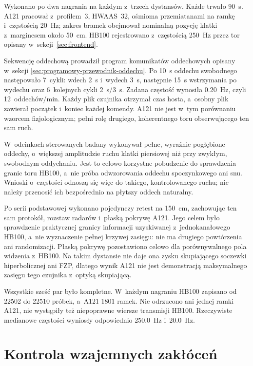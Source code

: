 \documentclass[12pt,a4paper,oneside]{report}
\begin{document}
Wykonano po dwa nagrania na każdym z~trzech dystansów. Każde trwało
\SI{90}{s}. A121 pracował z~profilem~3, HWAAS~32, ośmioma przemiatanami
na ramkę i~częstością \SI{20}{Hz}; zakres bramek obejmował nominalną
pozycję klatki z~marginesem około \SI{50}{cm}. HB100 rejestrowano
z~częstością \SI{250}{Hz} przez tor opisany w~sekcji~\ref{sec:frontend}.

Sekwencję oddechową prowadził program komunikatów oddechowych opisany w~sekcji
\ref{sec:programowy-przewodnik-oddechu}. Po \SI{10}{s} oddechu swobodnego następowało
7~cykli: wdech \SI{2}{s} i~wydech \SI{3}{s}, następnie \SI{15}{s}
wstrzymania po wydechu oraz 6~kolejnych cykli \SI{2}{s}/\SI{3}{s}. Zadana
częstość wynosiła \SI{0.20}{Hz}, czyli 12~oddechów/min. Każdy plik czujnika
otrzymał czas hosta, a~osobny plik zawierał początek i~koniec każdej komendy.
A121 nie jest w~tym porównaniu wzorcem fizjologicznym; pełni rolę drugiego,
koherentnego toru obserwującego ten sam ruch.

W~odcinkach sterowanych badany wykonywał pełne, wyraźnie pogłębione oddechy,
o~większej amplitudzie ruchu klatki piersiowej niż przy zwykłym, swobodnym
oddychaniu. Jest to celowo korzystne pobudzenie do sprawdzenia granic toru
HB100, a~nie próba odwzorowania oddechu spoczynkowego ani snu. Wnioski
o~częstości odnoszą się więc do takiego, kontrolowanego ruchu; nie należy
przenosić ich bezpośrednio na płytszy oddech naturalny.

Po serii podstawowej wykonano pojedynczy retest na \SI{150}{cm}, zachowując
ten sam protokół, rozstaw radarów i~płaską pokrywę A121. Jego celem było
sprawdzenie praktycznej granicy informacji uzyskiwanej z~jednokanałowego
HB100, a~nie wyznaczenie pełnej krzywej zasięgu: nie ma drugiego powtórzenia
ani randomizacji. Płaską pokrywę pozostawiono celowo dla porównywalnego pola
widzenia z~HB100. Na takim dystansie nie daje ona zysku skupiającego soczewki
hiperbolicznej ani FZP, dlatego wynik A121 nie jest demonstracją maksymalnego
zasięgu tego czujnika z~optyką skupiającą.

Wszystkie sześć par było kompletne. W~każdym nagraniu HB100 zapisano od
22502 do 22510 próbek, a~A121 1801 ramek. Nie odrzucono ani jednej ramki A121,
nie wystąpiły też niepoprawne wiersze transmisji HB100. Rzeczywiste medianowe
częstości wyniosły odpowiednio \SI{250.0}{Hz} i~\SI{20.0}{Hz}.

\section{Kontrola wzajemnych zakłóceń}
\end{document}
